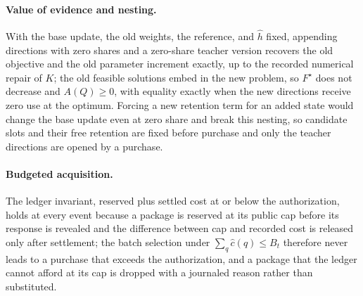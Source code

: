 \paragraph{Value of evidence and nesting.}
With the base update, the old weights, the reference, and $\hat h$
fixed, appending directions with zero shares and a zero-share teacher
version recovers the old objective and the old parameter increment
exactly, up to the recorded numerical repair of $K$; the old feasible
solutions embed in the new problem, so $F^{\star}$ does not decrease
and $A(Q)\ge0$, with equality exactly when the new directions receive
zero use at the optimum. Forcing a new retention term for an added
state would change the base update even at zero share and break this
nesting, so candidate slots and their free retention are fixed before
purchase and only the teacher directions are opened by a purchase.

\paragraph{Budgeted acquisition.}
The ledger invariant, reserved plus settled cost at or below the
authorization, holds at every event because a package is reserved at
its public cap before its response is revealed and the difference
between cap and recorded cost is released only after settlement; the
batch selection under $\sum_q\hat c(q)\le B_t$ therefore never leads
to a purchase that exceeds the authorization, and a package that the
ledger cannot afford at its cap is dropped with a journaled reason
rather than substituted.
